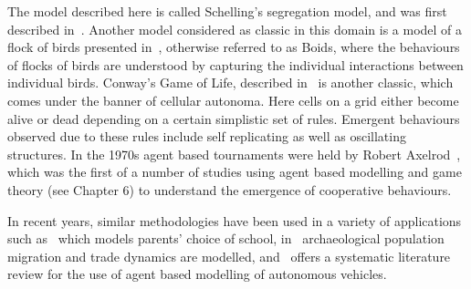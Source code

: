 The model described here is called Schelling's segregation model, and was
first described in~\cite{schelling2006micromotives}. Another model
considered as classic in this domain is a model of a flock of birds presented
in~\cite{reynolds1987flocks}, otherwise referred to as Boids, where the
behaviours of flocks of birds are understood by capturing the individual
interactions between individual birds. Conway's Game of Life, described
in~\cite{gardener1970mathematical} is another classic, which comes under
the banner of cellular autonoma. Here cells on a grid either become alive or dead
depending on a certain simplistic set of rules. Emergent behaviours observed due
to these rules include self replicating as well as oscillating structures.
In the 1970s agent based tournaments were held by Robert
Axelrod~\cite{axelrod1990evolution},
which was the first of a number of studies
using agent based modelling and game theory (see Chapter 6) to understand the
emergence of cooperative behaviours.

In recent years, similar methodologies have been used in a variety of
applications such as~\cite{diaz2021agent} which models parents' choice of school,
in~\cite{romanowska2019agent} archaeological population migration and trade
dynamics are modelled, and~\cite{jing2020agent} offers a systematic
literature review for the use of agent based modelling of autonomous vehicles.

